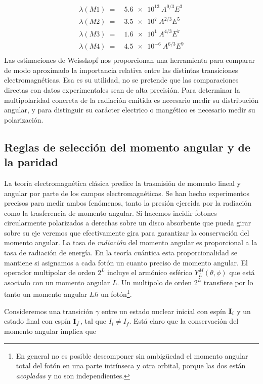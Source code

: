 \begin{equation}
	\begin{split}
	\lambda (M1) \ = \ & \unit{\num{5.6e13} \ A^{0/3}E^3} \\
	\lambda (M2) \ = \ & \unit{\num{3.5e7} \ A^{2/3}E^5} \\
	\lambda (M3) \ = \ & \unit{\num{1.6e1} \ A^{4/3}E^7} \\
	\lambda (M4) \ = \ & \unit{\num{4.5e-6} \ A^{6/3}E^9} \\
	\end{split}
\end{equation}
Las estimaciones de Weisskopf nos proporcionan una herramienta para comparar de modo aproximado la importancia relativa entre las distintas transiciones electromagnéticas. Esa es su utilidad, no se pretende que las comparaciones directas con datos experimentales sean de alta precisión. Para determinar la multipolaridad concreta de la radiación emitida es necesario medir su distribución angular, y para distinguir su carácter electrico o mangético es necesario medir su polarización. 


\subsection{Reglas de selección del momento angular y de la paridad}

La teoría electromagnética clásica predice la trasmisión de momento lineal y angular por parte de los campos electromagnéticas. Se han hecho experimentos precisos para medir ambos fenómenos, tanto la presión ejercida por la radiación como la trasferencia de momento angular. Si hacemos incidir fotones circularmente polarizados a derechas sobre un disco absorbente que pueda girar sobre su eje veremos que efectivamente gira para garantizar la conservación del momento angular. La tasa de \textit{radiación} del momento angular es proporcional a la tasa de radiación de energía. En la teoría cuántica esta proporcionalidad se mantiene si asignamos a cada fotón un cuanto preciso de momento angular. El operador multipolar de orden $2^L$ incluye el armónico esférico $Y_L^M (\theta,\phi)$ que está asociado con un momento angular $L$. Un multipolo de orden $2^L$ transfiere por lo tanto un momento angular $L\hbar$ un fotón\footnote{En general no es posible descomponer sin ambigüedad el momento angular total del fotón en una parte intrínseca y otra orbital, porque las dos están \textit{acopladas} y no son independientes.}.

Consideremos una transición $\gamma$ entre un estado nuclear inicial con espín $\mathbf{I}_i$ y un estado final con espín $\mathbf{I}_f$, tal que $I_i\neq I_f$. Está claro que la conservación del momento angular implica que

